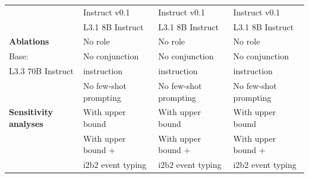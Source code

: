 \begin{table}[htbp]
\begin{ChSixFloatBody}
\begin{adjustbox}{width=0.8\textwidth}
\begin{tabular}{|>{\raggedright\arraybackslash}p{3.5cm}|>{\raggedright\arraybackslash}p{3.5cm}|>{\raggedright\arraybackslash}p{3.5cm}|>{\raggedright\arraybackslash}p{3.5cm}|}
                                & \quad Instruct v0.1 & \quad Instruct v0.1                & \quad Instruct v0.1                   \\ 
                                & L3.1 8B Instruct             & L3.1 8B Instruct                & L3.1 8B Instruct                  \\ \hline
\parbox{3cm}{\textbf{Ablations}} & No role                  & No role                  & No role                   \\ 
Base: & No conjunction & No conjunction & No conjunction
                                \\ 
L3.3 70B Instruct                        & \quad instruction &  \quad instruction & \quad instruction \\
                                
                                & No few-shot prompting    & No few-shot prompting    & No few-shot prompting     \\ \hline
\textbf{Sensitivity analyses}   & With upper bound         & With upper bound         & With upper bound          \\ 
                                & With upper bound + 
                                                         & With upper bound +  
                                                                                      & With upper bound + \\
                                & \quad i2b2 event typing & \quad i2b2 event typing & \quad i2b2 event typing \\
                                                                                      \hline
\end{tabular}
\end{adjustbox}

\end{ChSixFloatBody}
\end{table}
